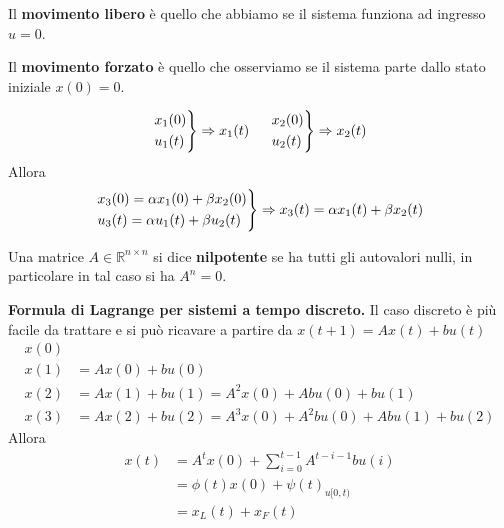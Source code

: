 \documentclass[10pt,a4paper]{book}
\begin{document}
Il \textbf{movimento libero} è quello che abbiamo se il sistema funziona ad ingresso $u=0$.

Il \textbf{movimento forzato} è quello che osserviamo se il sistema parte dallo stato iniziale $x(0) =0$.
\begin{theorem}
	\begin{equation*}
		\begin{drcases}
			x_1(0)\\
			u_1(t)
		\end{drcases} \Rightarrow x_1(t) \ \ \ \ \begin{drcases}
		x_2(0)\\
		u_2(t)
		\end{drcases} \Rightarrow x_2(t)
	\end{equation*}
	Allora
	\begin{equation*}
		\begin{drcases}
			x_3(0) =\alpha x_1(0) +\beta x_2(0)\\
			u_3(t) =\alpha u_1(t) +\beta u_2(t)
		\end{drcases} \Rightarrow x_3(t) =\alpha x_1(t) +\beta x_2(t)
	\end{equation*}
\end{theorem}
\begin{ricalg}
	Una matrice $A\in \mathbb{R}^{n\times n}$ si dice \textbf{nilpotente} se ha tutti gli autovalori nulli, in particolare in tal caso si ha $A^n =0$.
\end{ricalg}
\textbf{Formula di Lagrange per sistemi a tempo discreto.} Il caso discreto è più facile da trattare e si può ricavare a partire da $x(t+1)=Ax(t)+bu(t)$
\begin{equation*}
	\begin{aligned}
		x(0) &                                                   \\
		x(1) & =Ax(0) +bu(0)                                     \\
		x(2) & =Ax(1) +bu(1) =A^2 x(0) +Abu(0) +bu(1)            \\
		x(3) & =Ax(2) +bu(2) =A^3 x(0) +A^2 bu(0) +Abu(1) +bu(2) 
	\end{aligned}
\end{equation*}
Allora
\begin{equation}
	\boxed{
		\begin{aligned}
			x(t) & =A^t x(0) +\sum\limits ^{t-1}_{i=0} A^{t-i-1} bu(i) \\
			     & =\phi (t) x(0) +\psi (t)_{u[ 0,t)}                  \\
			     & =x_L(t) +x_F(t)                                     
		\end{aligned}
	}
\end{equation}
\end{document}
